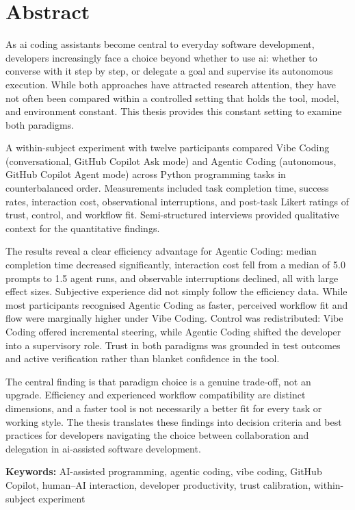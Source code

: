 \chapter*{Abstract}

As \gls{ai} coding assistants become central to everyday software development, developers increasingly face a choice beyond whether to use \gls{ai}: whether to converse with it step by step, or delegate a goal and supervise its autonomous execution. While both approaches have attracted research attention, they have not often been compared within a controlled setting that holds the tool, model, and environment constant. This thesis provides this constant setting to examine both paradigms.

A within-subject experiment with twelve participants compared Vibe Coding (conversational, GitHub Copilot Ask mode) and Agentic Coding (autonomous, GitHub Copilot Agent mode) across Python programming tasks in counterbalanced order. Measurements included task completion time, success rates, interaction cost, observational interruptions, and post-task Likert ratings of trust, control, and workflow fit. Semi-structured interviews provided qualitative context for the quantitative findings.

The results reveal a clear efficiency advantage for Agentic Coding: median completion time decreased significantly, interaction cost fell from a median of 5.0 prompts to 1.5 agent runs, and observable interruptions declined, all with large effect sizes. Subjective experience did not simply follow the efficiency data. While most participants recognised Agentic Coding as faster, perceived workflow fit and flow were marginally higher under Vibe Coding. Control was redistributed: Vibe Coding offered incremental steering, while Agentic Coding shifted the developer into a supervisory role. Trust in both paradigms was grounded in test outcomes and active verification rather than blanket confidence in the tool.

The central finding is that paradigm choice is a genuine trade-off, not an upgrade. Efficiency and experienced workflow compatibility are distinct dimensions, and a faster tool is not necessarily a better fit for every task or working style. The thesis translates these findings into decision criteria and best practices for developers navigating the choice between collaboration and delegation in \gls{ai}-assisted software development.

\medskip\noindent

\textbf{Keywords:} AI-assisted programming, agentic coding, vibe coding, GitHub Copilot, human--AI interaction, developer productivity, trust calibration, within-subject experiment

\clearpage
